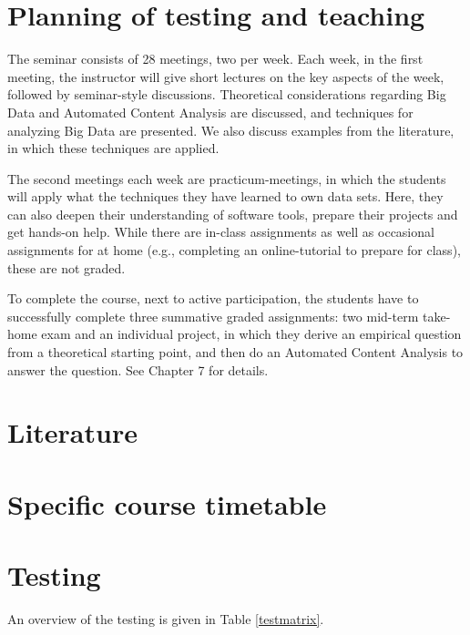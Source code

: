 \documentclass[a4paper,12pt]{report}
\begin{document}
\chapter{Planning of testing and teaching}

The seminar consists of 28 meetings, two per week. Each week, in the first meeting, the instructor will give short lectures on the key aspects of the week, followed by seminar-style discussions. Theoretical considerations regarding Big Data and Automated Content Analysis are discussed, and techniques for analyzing Big Data are presented. We also discuss examples from the literature, in which these techniques are applied.


The second meetings each week are practicum-meetings, in which the students will apply what the techniques they have learned to own data sets. Here, they can also deepen their understanding of software tools, prepare their projects and get hands-on help. While there are in-class assignments as well as occasional assignments for at home (e.g., completing an online-tutorial to prepare for class), these are not graded.


To complete the course, next to active participation, the students have to successfully complete three summative graded assignments: two mid-term take-home exam and an individual project, in which they derive an empirical question from a theoretical starting point, and then do an Automated Content Analysis to answer the question. See Chapter 7 for details.


\chapter{Literature}




\chapter{Specific course timetable}





\chapter{Testing}
An overview of the testing is given in Table \ref{testmatrix}.
\end{document}
